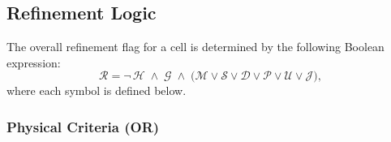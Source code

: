 \documentclass[fleqn,usenatbib]{mnras}
\begin{document}
\subsection{Refinement Logic}
\label{sec:refine_logic}

The overall refinement flag for a cell is determined by the following
Boolean expression:
\begin{equation}
\mathcal{R} = \lnot\,\mathcal{H}
  \;\land\; \mathcal{G}
  \;\land\; \bigl(
    \mathcal{M} \lor \mathcal{S} \lor \mathcal{D} \lor \mathcal{P}
    \lor \mathcal{U} \lor \mathcal{J}
  \bigr),
\label{eq:refine_flag}
\end{equation}
where each symbol is defined below.

\subsubsection{Physical Criteria (OR)}
\end{document}
